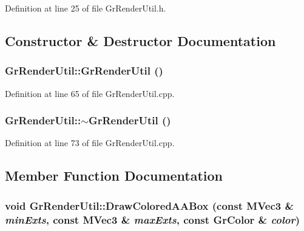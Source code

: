 Definition at line 25 of file GrRenderUtil.h.

\subsection{Constructor \& Destructor Documentation}
\hypertarget{class_gr_render_util_046984eb05f9c2caaacf759ba5b383e6}{
\subsubsection[{GrRenderUtil}]{\setlength{\rightskip}{0pt plus 5cm}GrRenderUtil::GrRenderUtil ()}}
\label{class_gr_render_util_046984eb05f9c2caaacf759ba5b383e6}




Definition at line 65 of file GrRenderUtil.cpp.\hypertarget{class_gr_render_util_cc6a5f205a3784e3814ecffd2b45c621}{
\subsubsection[{$\sim$GrRenderUtil}]{\setlength{\rightskip}{0pt plus 5cm}GrRenderUtil::$\sim$GrRenderUtil ()}}
\label{class_gr_render_util_cc6a5f205a3784e3814ecffd2b45c621}




Definition at line 73 of file GrRenderUtil.cpp.

\subsection{Member Function Documentation}
\hypertarget{class_gr_render_util_2393c582878b53d17b85ab809f44f15c}{
\subsubsection[{DrawColoredAABox}]{\setlength{\rightskip}{0pt plus 5cm}void GrRenderUtil::DrawColoredAABox (const {\bf MVec3} \& {\em minExts}, \/  const {\bf MVec3} \& {\em maxExts}, \/  const {\bf GrColor} \& {\em color})}}
\label{class_gr_render_util_2393c582878b53d17b85ab809f44f15c}




